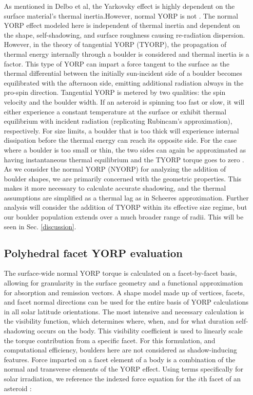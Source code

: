 As mentioned in Delbo et al, the Yarkovsky effect is highly dependent on the surface material's thermal inertia.However, normal YORP is not \cite{Delbo2015}. The normal YORP effect modeled here is independent of thermal inertia and dependent on the shape, self-shadowing, and surface roughness causing re-radiation dispersion. However, in the theory of tangential YORP (TYORP), the propagation of thermal energy internally through a boulder is considered and thermal inertia is a factor. This type of YORP can impart a force tangent to the surface as the thermal differential between the initially sun-incident side of a boulder becomes equilibrated with the afternoon side, emitting additional radiation always in the pro-spin direction. Tangential YORP is metered by two qualities: the spin velocity and the boulder width. If an asteroid is spinning too fast or slow, it will either experience a constant temperature at the surface or exhibit thermal equilibrium with incident radiation (replicating Rubincam's approximation), respectively. For size limits, a boulder that is too thick will experience internal dissipation before the thermal energy can reach its opposite side. For the case where a boulder is too small or thin, the two sides can again be approximated as having instantaneous thermal equilibrium and the TYORP torque goes to zero \cite{Golubov2012}. 
\\ \indent As we consider the normal YORP (NYORP) for analyzing the addition of boulder shapes, we are primarily concerned with the geometric properties. This makes it more necessary to calculate accurate shadowing, and the thermal assumptions are simplified as a thermal lag as in Scheeres approximation. Further analysis will consider the addition of TYORP within its effective size regime, but our boulder population extends over a much broader range of radii. This will be seen in Sec. \ref{discussion}. 

\subsection{Polyhedral facet YORP evaluation}\label{PFYORPE}

The surface-wide normal YORP torque is calculated on a facet-by-facet basis, allowing for granularity in the surface geometry and a functional approximation for absorption and remission vectors. A shape model made up of vertices, facets, and facet normal directions can be used for the entire basis of YORP calculations in all solar latitude orientations. The most intensive and necessary calculation is the visibility function, which determines where, when, and for what duration self-shadowing occurs on the body. This visibility coefficient is used to linearly scale the torque contribution from a specific facet. For this formulation, and computational efficiency, boulders here are not considered as shadow-inducing features. 
Force imparted on a facet element of a body is a combination of the normal and transverse elements of the YORP effect. Using terms specifically for solar irradiation, we reference the indexed force equation for the $i$th facet of an asteroid \cite{Scheeres2007}:

